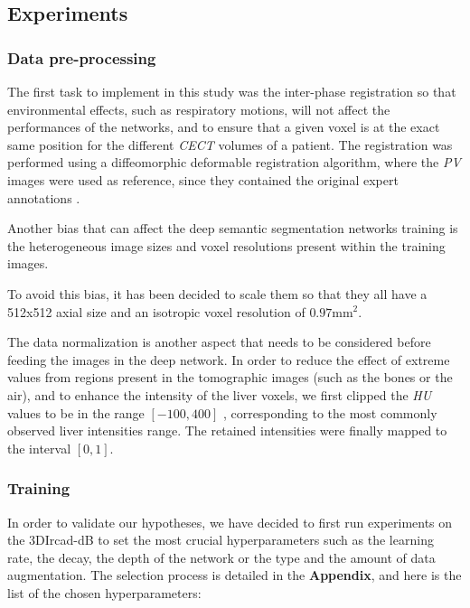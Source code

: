 \documentclass[]{article}
\begin{document}
\subsection*{Experiments}

\subsubsection*{Data pre-processing}

The first task to implement in this study was the inter-phase
registration so that environmental effects, such as respiratory motions,
will not affect the performances of the networks, and to ensure that a
given voxel is at the exact same position for the different \emph{CECT}
volumes of a patient. The registration was performed using a
diffeomorphic deformable registration algorithm, where the \emph{PV}
images were used as reference, since they contained the original expert
annotations \cite{Avants2008, Conze2017, Ben-Cohen, Christ2017}.

Another bias that can affect the deep semantic segmentation networks
training is the heterogeneous image sizes and voxel resolutions present
within the training images.

To avoid this bias, it has been decided to scale them so that they all
have a 512x512 axial size and an isotropic voxel resolution of $ 0.97 \text{mm}^2 $.

The data normalization is another aspect that needs to be considered
before feeding the images in the deep network. In order to reduce the
effect of extreme values from regions present in the tomographic images
(such as the bones or the air), and to enhance the intensity of the
liver voxels, we first clipped the \emph{HU} values to be in the range
$ \left[-100, 400\right] $ , corresponding to the most commonly observed liver intensities range. The retained intensities were finally mapped to
the interval $ \left[0, 1\right] $.

\subsubsection*{Training}

In order to validate our hypotheses, we have decided to first run
experiments on the 3DIrcad-dB to set the most crucial hyperparameters
such as the learning rate, the decay, the depth of the network or the
type and the amount of data augmentation.
The selection process is detailed in the \textbf{Appendix}, and here is the list of the chosen hyperparameters:
\end{document}
